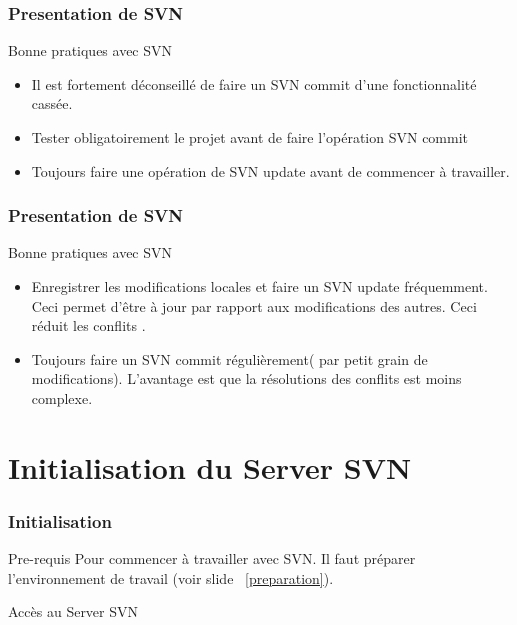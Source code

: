 \documentclass{beamer}
\begin{document}
\begin{frame}
\frametitle{Presentation de SVN}
\begin{block}{Bonne pratiques avec SVN}
\begin{itemize}
\item  Il est fortement déconseillé de faire un \alert{SVN commit  d’une fonctionnalité cassée}.
\item \alert{Tester obligatoirement le projet} avant de faire l’opération SVN commit
\item Toujours faire une opération de  \alert{SVN update} avant de commencer à travailler. 
 
\end{itemize}
\end{block}
\end{frame}

\begin{frame}
\frametitle{Presentation de SVN}
\begin{block}{Bonne pratiques avec SVN}
\begin{itemize}
\item Enregistrer  les modifications locales et faire un \alert{SVN update} fréquemment. Ceci permet d'être à jour par rapport aux modifications des autres. Ceci réduit les conflits .
\item Toujours faire  un \alert{SVN commit} régulièrement( par petit grain de modifications). L'avantage est que la résolutions des conflits est moins complexe. 
\end{itemize}
\end{block}
\end{frame}

\section{Initialisation du Server SVN }

\begin{frame}
\frametitle{Initialisation}
\begin{block}{Pre-requis}
Pour commencer à travailler avec SVN. Il faut préparer l'environnement de travail (voir slide ~\ref{preparation}).
\end{block}
\end{frame}

\begin{frame}
\begin{center}
\huge{Accès au Server SVN}
\end{center}
\end{frame}
\end{document}
